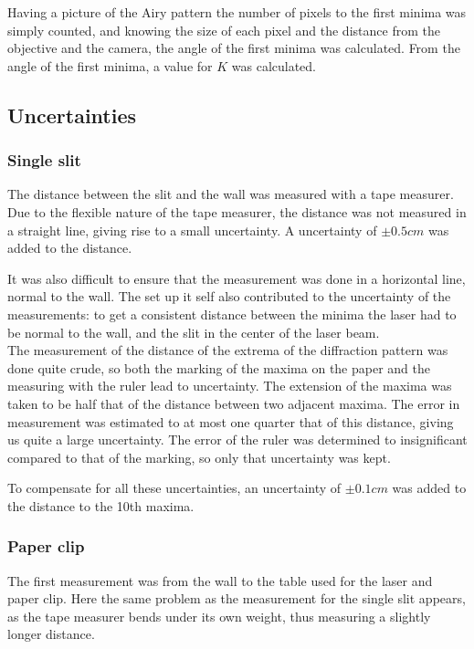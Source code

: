 \documentclass{emulateapj}
\begin{document}
Having a picture of the Airy pattern the number of pixels to the first minima was simply counted, and knowing the size of each pixel and the distance from the objective and the camera, the angle of the first minima was calculated. From the angle of the first minima, a value for $K$ was calculated.
 

\subsection{Uncertainties}
\subsubsection{Single slit}
The distance between the slit and the wall was measured with a tape measurer. Due to the flexible nature of the tape measurer, the distance was not measured in a straight line, giving rise to a small uncertainty. A uncertainty of $\pm 0.5 cm$ was added to the distance.

It was also difficult to ensure that the measurement was done in a horizontal line, normal to the wall. The set up it self also contributed to the uncertainty of the measurements: to get a consistent distance between the minima the laser had to be normal to the wall, and the slit in the center of the laser beam. \\

The measurement of the distance of the extrema of the diffraction pattern was done quite crude, so both the marking of the maxima on the paper and the measuring with the ruler lead to uncertainty. The extension of the maxima was taken to be half that of the distance between two adjacent maxima. The error in measurement was estimated to at most one quarter that of this distance, giving us quite a large uncertainty. The error of the ruler was determined to insignificant compared to that of the marking, so only that uncertainty was kept.

To compensate for all these uncertainties, an uncertainty of $\pm 0.1 cm$ was added to the distance to the 10th maxima.


\subsubsection{Paper clip}
The first measurement was from the wall to the table used for the laser and paper clip. Here the same problem as the measurement for the single slit appears, as the tape measurer bends under its own weight, thus measuring a slightly longer distance. 
\end{document}
